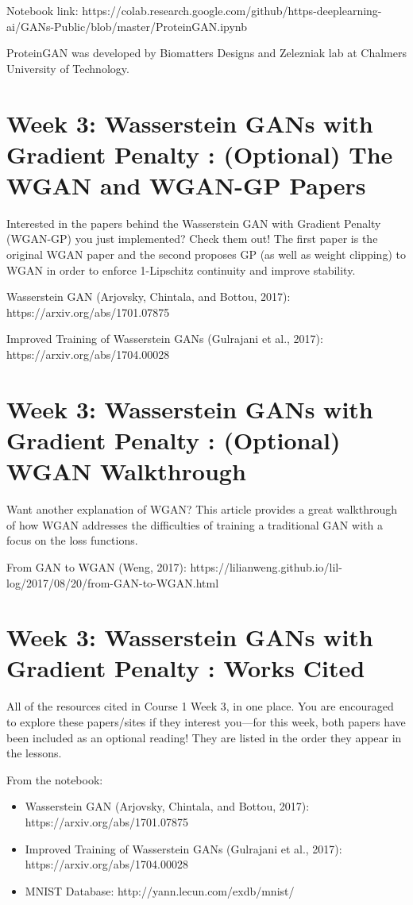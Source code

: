 \documentclass[11pt, onecolumn]{article}
\begin{document}
Notebook link: https://colab.research.google.com/github/https-deeplearning-ai/GANs-Public/blob/master/ProteinGAN.ipynb

ProteinGAN was developed by Biomatters Designs and Zelezniak lab at Chalmers University of Technology.

\section{Week 3: Wasserstein GANs with Gradient Penalty : (Optional) The WGAN and WGAN-GP Papers}

Interested in the papers behind the Wasserstein GAN with Gradient Penalty (WGAN-GP) you just implemented? Check them out! The first paper is the original WGAN paper and the second proposes GP (as well as weight clipping) to WGAN in order to enforce 1-Lipschitz continuity and improve stability.

Wasserstein GAN (Arjovsky, Chintala, and Bottou, 2017): https://arxiv.org/abs/1701.07875

Improved Training of Wasserstein GANs (Gulrajani et al., 2017): https://arxiv.org/abs/1704.00028

\section{Week 3: Wasserstein GANs with Gradient Penalty : (Optional) WGAN Walkthrough}

Want another explanation of WGAN? This article provides a great walkthrough of how WGAN addresses the difficulties of training a traditional GAN with a focus on the loss functions.

From GAN to WGAN (Weng, 2017): https://lilianweng.github.io/lil-log/2017/08/20/from-GAN-to-WGAN.html

\section{Week 3: Wasserstein GANs with Gradient Penalty : Works Cited}

All of the resources cited in Course 1 Week 3, in one place.  You are encouraged to explore these papers/sites if they interest you—for this week, both papers have been included as an optional reading! They are listed in the order they appear in the lessons.

From the notebook:
\begin{itemize}
\item Wasserstein GAN (Arjovsky, Chintala, and Bottou, 2017): https://arxiv.org/abs/1701.07875
\item Improved Training of Wasserstein GANs (Gulrajani et al., 2017): https://arxiv.org/abs/1704.00028
\item MNIST Database: http://yann.lecun.com/exdb/mnist/
\end{itemize}
\end{document}
